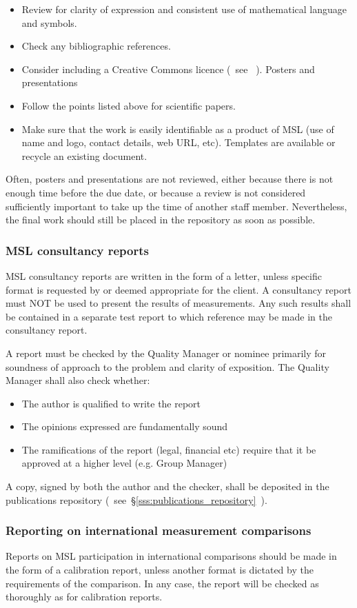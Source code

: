 \begin{itemize}
\item  Review for clarity of expression and consistent use of mathematical language and symbols.  
\item  Check any bibliographic references. 
\item  Consider including a Creative Commons licence (~see \cite[\S\ref*{GRP-s_copyright}]{MSL_Reporting_Guidelines}~).
 Posters and presentations
\item  Follow the points listed above for scientific papers.
\item  Make sure that the work is easily identifiable as a product of MSL (use of name and logo, contact details, web URL, etc). Templates are available or recycle an existing document.
\end{itemize} 

Often, posters and presentations are not reviewed, either because there is not enough time before the due date, or because a review is not considered sufficiently important to take up the time of another staff member. Nevertheless, the final work should still be placed in the repository as soon as possible. 

\subsubsection{MSL consultancy reports}
MSL consultancy reports are written in the form of a letter, unless specific format is requested by or deemed appropriate for the client.
A consultancy report must NOT be used to present the results of measurements. Any such results shall be contained in a separate test report to which reference may be made in the consultancy report.

A report must be checked by the Quality Manager or nominee primarily for soundness of approach to the problem and clarity of exposition. The Quality Manager shall also check whether: 
\begin{itemize}
\item  The author is qualified to write the report
\item  The opinions expressed are fundamentally sound
\item  The ramifications of the report (legal, financial etc) require that it be approved at a higher level (e.g. Group Manager)
\end{itemize}
A copy, signed by both the author and the checker, shall be deposited in the publications repository (~see~\S\ref{sss:publications_repository}~). 

\subsubsection{Reporting on international measurement comparisons}
Reports on MSL participation in international comparisons should be made in the form of a calibration report, unless another format is dictated by the requirements of the comparison. In any case, the report will be checked as thoroughly as for calibration reports.

